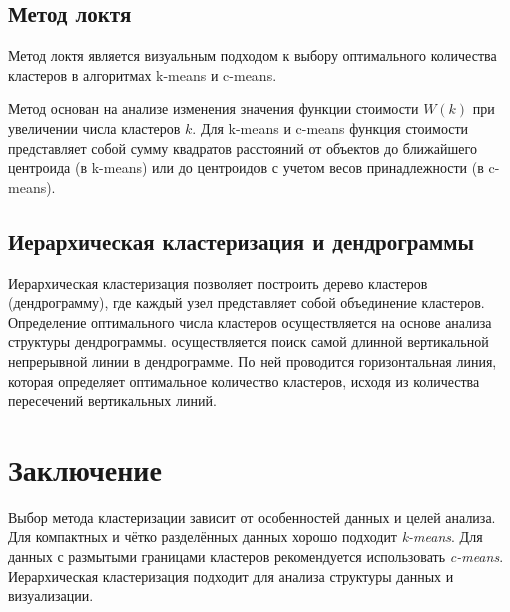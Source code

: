 \subsection{Метод локтя}
Метод локтя является визуальным подходом к выбору оптимального количества кластеров в алгоритмах k-means и c-means. 

Метод основан на анализе изменения значения функции стоимости $W(k)$ при увеличении числа кластеров $k$. 
Для k-means и c-means функция стоимости представляет собой сумму квадратов расстояний от объектов до ближайшего центроида (в k-means) 
или до центроидов с учетом весов принадлежности (в c-means).

\subsection{Иерархическая кластеризация и дендрограммы}
Иерархическая кластеризация позволяет построить дерево кластеров (дендрограмму), 
где каждый узел представляет собой объединение кластеров. 
Определение оптимального числа кластеров осуществляется на основе анализа структуры дендрограммы.
осуществляется поиск самой длинной вертикальной непрерывной линии в дендрограмме.
По ней проводится горизонтальная линия, которая определяет оптимальное количество кластеров, исходя из количества пересечений вертикальных линий.


\section{Заключение}
Выбор метода кластеризации зависит от особенностей данных и целей анализа. 
Для компактных и чётко разделённых данных хорошо подходит \textit{k-means}. 
Для данных с размытыми границами кластеров рекомендуется использовать \textit{c-means}. 
Иерархическая кластеризация подходит для анализа структуры данных и визуализации.

\clearpage

